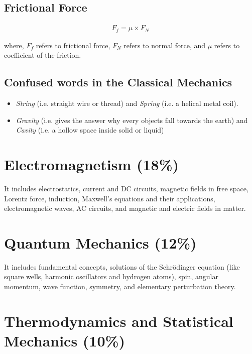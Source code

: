 \documentclass[12pt,a4paper]{article}
\begin{document}
\subsection{Frictional Force}

\begin{align}
F_{f} = \mu \times F_{N}
\end{align}

where, $F_{f}$ refers to frictional force, $F_{N}$ refers to normal force, and $\mu$ refers to coefficient of the friction.


\subsection{Confused words in the Classical Mechanics}

\begin{itemize}
\item \emph{String} (i.e. straight wire or thread) and \emph{Spring} (i.e. a helical metal coil).
\item \emph{Gravity} (i.e. gives the answer why every objects fall towards the earth) and \emph{Cavity} (i.e. a hollow space inside solid or liquid)
\end{itemize}
\section{Electromagnetism (18\%)}

It includes electrostatics, current and DC circuits, magnetic fields in free space, Lorentz force, induction, Maxwell's equations and their applications, electromagnetic waves, AC circuits, and magnetic and electric fields in matter.

\section{Quantum Mechanics (12\%)}

It includes fundamental concepts, solutions of the Schr\"{o}dinger equation (like square wells, harmonic oscillators and hydrogen atoms), spin, angular momentum, wave function, symmetry, and elementary perturbation theory.


\section{Thermodynamics and Statistical Mechanics (10\%)}
\end{document}
